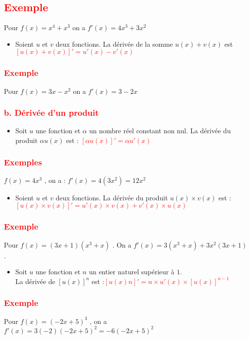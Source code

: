 \documentclass[12pt]{article}
\begin{document}
\subsection*{\textcolor{red}{Exemple}}
Pour $f(x)=x^{4}+x^{3}$ on a $f'(x)=4x^{3}+3x^{2}$
\begin{itemize}
\item Soient $u$ et $v$ deux fonctions. La dérivée de la somme $u(x) + v(x)$ est\\
\textcolor{red}{$[u(x) + v(x)]'=u'(x) - v'(x)$}
\end{itemize}
\subsubsection*{\textcolor{red}{Exemple}}
Pour $f(x)=3x-x^{2}$ on a $f'(x)=3-2x$
\subsubsection*{\textcolor{red}{b. Dérivée d’un produit}}
\begin{itemize}
\item Soit $u$ une fonction et $\alpha$ un nombre réel constant non nul. La dérivée du produit 
$\alpha u(x)$
est : \textcolor{red}{$[\alpha u(x)]' = \alpha u'(x)$}
\end{itemize}
\subsubsection*{\textcolor{red}{Exemples}}
$f(x) =4x^{3}$ , on a : $f'(x) = 4(3x^{2}) =12x^{2} $
\begin{itemize}
\item Soient $u$ et $v$ deux fonctions. La dérivée du produit $u(x) \times v(x)$ est : 
\textcolor{red}{$[u(x) \times v(x)]' =u'(x) \times v(x) + v'(x) \times u(x)$}
\end{itemize}
\subsubsection*{\textcolor{red}{Exemple}}
Pour $f(x)=(3x+1)(x^{3}+x)$ . On a $f'(x)=3(x^{3}+x)+3x^{2}(3x+1)$.
\begin{itemize}
\item Soit $u$ une fonction et $n$ un entier naturel supérieur à $1$.\\
La dérivée de $[u(x)]^{n}$ est :\textcolor{red}{$[u(x)n]' = n \times u'(x) \times [u(x)]^{n-1}$}
\end{itemize}
\subsubsection*{\textcolor{red}{Exemple}}
Pour $f(x) =(-2x + 5)^{3}$ , on a $f'(x) = 3(-2)(-2x + 5)^{2} =-6(-2x + 5)^{2}$
\end{document}
